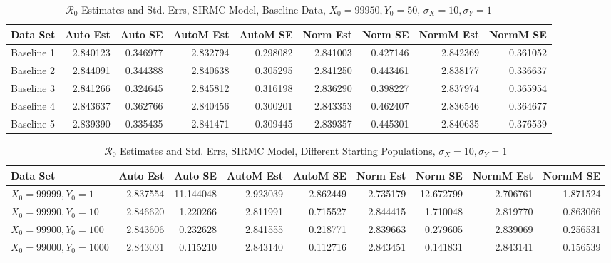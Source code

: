 \documentclass[12pt]{article}
\newcommand{\rr}{\ensuremath{\mathcal{R}_0}}
\begin{document}
\begin{table}[H]
	
	\caption{$\rr$ Estimates and Std. Errs, SIRMC Model,
		Baseline Data, $X_0 = 99950, Y_0 = 50$, 
		$\sigma_X = 10, \sigma_Y = 1$}
	\begin{footnotesize}
		\hskip -1cm
		\begin{tabular}{l|r|r|r|r|r|r|r|r}
			\hline
			Data Set & Auto Est & Auto SE & AutoM Est & AutoM SE & Norm Est & Norm SE & NormM Est & NormM SE\\
			\hline
			Baseline 1 & 2.840123 & 0.346977 & 2.832794 & 0.298082 & 2.841003 & 0.427146 & 2.842369 & 0.361052\\
			\hline
			Baseline 2 & 2.844091 & 0.344388 & 2.840638 & 0.305295 & 2.841250 & 0.443461 & 2.838177 & 0.336637\\
			\hline
			Baseline 3 & 2.841266 & 0.324645 & 2.845812 & 0.316198 & 2.836290 & 0.398227 & 2.837974 & 0.365954\\
			\hline
			Baseline 4 & 2.843637 & 0.362766 & 2.840456 & 0.300201 & 2.843353 & 0.462407 & 2.836546 & 0.364677\\
			\hline
			Baseline 5 & 2.839390 & 0.335435 & 2.841471 & 0.309445 & 2.839357 & 0.445301 & 2.840635 & 0.376539\\
			\hline
		\end{tabular}
	\end{footnotesize}
\end{table}

\begin{table}[H]
	
	\caption{$\rr$ Estimates and Std. Errs, SIRMC Model,
		Different Starting Populations, 
		$\sigma_X = 10, \sigma_Y = 1$}
	\begin{footnotesize}
		\hskip -1.7cm
		\begin{tabular}{l|r|r|r|r|r|r|r|r}
			\hline
			Data Set & Auto Est & Auto SE & AutoM Est & AutoM SE & Norm Est & Norm SE & NormM Est & NormM SE\\
			\hline
			$X_0 = 99999, Y_0 = 1$ & 2.837554 & 11.144048 & 2.923039 & 2.862449 & 2.735179 & 12.672799 & 2.706761 & 1.871524\\
			\hline
			$X_0 = 99990, Y_0 = 10$ & 2.846620 & 1.220266 & 2.811991 & 0.715527 & 2.844415 & 1.710048 & 2.819770 & 0.863066\\
			\hline
			$X_0 = 99900, Y_0 = 100$ & 2.843606 & 0.232628 & 2.841555 & 0.218771 & 2.839663 & 0.279605 & 2.839069 & 0.256531\\
			\hline
			$X_0 = 99000, Y_0 = 1000$ & 2.843031 & 0.115210 & 2.843140 & 0.112716 & 2.843451 & 0.141831 & 2.843141 & 0.156539\\
			\hline
		\end{tabular}
	\end{footnotesize}
\end{table}
\end{document}
